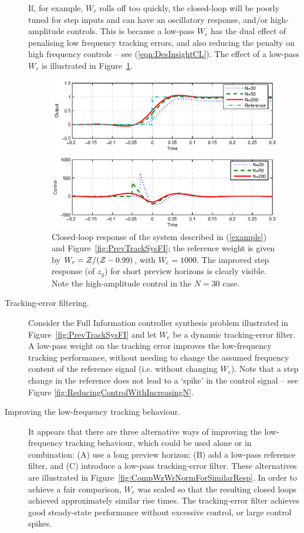 \begin{description}
If, for example, $W_r$ rolls off too quickly, the closed-loop will be poorly tuned for step inputs and can have an oscillatory response, and/or high-amplitude controls. This is because a low-pass $W_r$ has the dual effect of penalising low frequency tracking errors, and also reducing the penalty on high frequency controls -- see (\ref{eqn:DesInsightCL}).
The effect of a low-pass $W_r$ is illustrated in Figure~\ref{fig:WrWithIncreasingPreview}.
\begin{figure}
\includegraphics[width=\columnwidth]{./diags/WrWithIncreasingPreview.eps}
\caption{Closed-loop response of the system described in (\ref{example}) and Figure~\ref{fig:PrevTrackSysFI}; the reference weight is given by $W_r=\mathcal{Z}/(\mathcal{Z}-0.99)$, with $W_e=1000$. The improved step response (of $z_g$) for short preview horizons is clearly visible. Note the high-amplitude control in the $N=30$ case. \label{fig:WrWithIncreasingPreview}}
\end{figure}
\item[Tracking-error filtering.]
Consider the Full Information controller synthesis problem illustrated in Figure~\ref{fig:PrevTrackSysFI} and let $W_e$ be a dynamic
tracking-error filter. A low-pass weight on the tracking error improves the low-frequency tracking performance, without needing to change the assumed frequency content of the reference signal (i.e. without changing $W_r$). Note that a step change in the reference does not lead to a `spike' in the control signal -- see Figure \ref{fig:ReducingControlWithIncreasingN}. 
\item[Improving the low-frequency tracking behaviour.]
It appears that there are three alternative ways of improving the low-frequency tracking behaviour, which could be used alone or in combination: (A) use a long preview horizon; (B) add a low-pass reference filter, and (C) introduce a low-pass tracking-error filter. These alternatives are illustrated in Figure~\ref{fig:CompWzWrNormForSimilarResp}. In order to achieve a fair comparison, $W_e$ was scaled so that the resulting closed loops achieved approximately similar rise times. The tracking-error filter achieves good steady-state performance without excessive control, or large control spikes.

\end{description}
